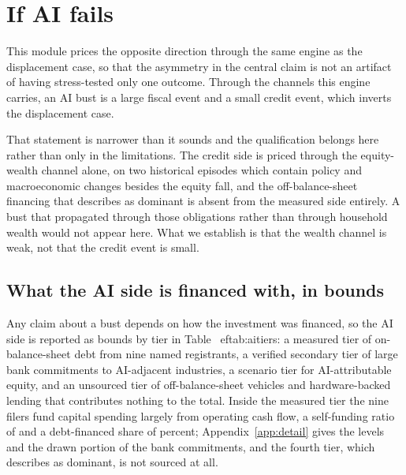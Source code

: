 \section{If AI fails}
\label{sec:bust}

This module prices the opposite direction through the same engine as the displacement case, so
that the asymmetry in the central claim is not an artifact of having stress-tested only one
outcome. Through the channels this engine carries, an AI bust is a large fiscal event and a
small credit event, which inverts the displacement case.

That statement is narrower than it sounds and the qualification belongs here rather than only in
the limitations. The credit side is priced through the equity-wealth channel alone, on two
historical episodes which contain policy and macroeconomic changes besides the equity fall, and
the off-balance-sheet financing that \citet{BIS2026} describes as dominant is absent from the
measured side entirely. A bust that propagated through those obligations rather than through
household wealth would not appear here. What we establish is that the wealth channel is weak,
not that the credit event is small.

\subsection{What the AI side is financed with, in bounds}

Any claim about a bust depends on how the investment was financed, so the AI side is reported as
bounds by tier in Table~
ef{tab:aitiers}: a measured tier of on-balance-sheet debt from nine named registrants, a verified secondary tier of large bank commitments to AI-adjacent industries, a scenario tier for AI-attributable equity, and an unsourced tier of off-balance-sheet vehicles and hardware-backed lending that contributes nothing to the total. Inside the
measured tier the nine filers fund capital spending largely from operating cash flow, a
self-funding ratio of  and a debt-financed share of
 percent; Appendix~\ref{app:detail} gives the levels and the drawn
portion of the bank commitments, and the fourth tier, which \citet{BIS2026} describes as dominant,
is not sourced at all.

\begin{table}[htbp]
\centering
\caption{The AI side by tier of evidence. Tier 1 is measured from filings and is a lower bound on
the total; tier 4 is unsourced and is the hole the financing verdict turns on. Cells with no
sourced value read n/a.}
\label{tab:aitiers}

\end{table}

